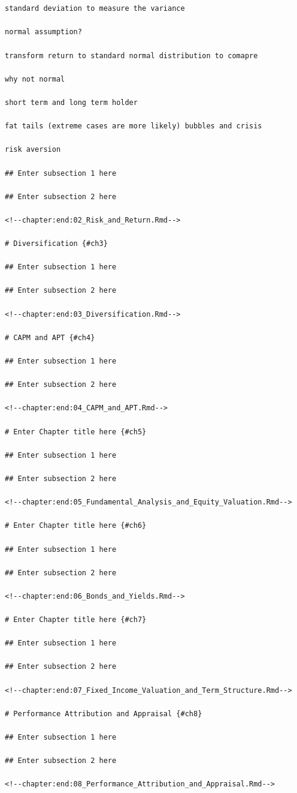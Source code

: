 \documentclass[
]{book}
\begin{document}
\begin{verbatim}


standard deviation to measure the variance

normal assumption? 

transform return to standard normal distribution to comapre

why not normal

short term and long term holder

fat tails (extreme cases are more likely) bubbles and crisis

risk aversion

## Enter subsection 1 here

## Enter subsection 2 here

<!--chapter:end:02_Risk_and_Return.Rmd-->

# Diversification {#ch3}

## Enter subsection 1 here

## Enter subsection 2 here

<!--chapter:end:03_Diversification.Rmd-->

# CAPM and APT {#ch4}

## Enter subsection 1 here

## Enter subsection 2 here

<!--chapter:end:04_CAPM_and_APT.Rmd-->

# Enter Chapter title here {#ch5}

## Enter subsection 1 here

## Enter subsection 2 here

<!--chapter:end:05_Fundamental_Analysis_and_Equity_Valuation.Rmd-->

# Enter Chapter title here {#ch6}

## Enter subsection 1 here

## Enter subsection 2 here

<!--chapter:end:06_Bonds_and_Yields.Rmd-->

# Enter Chapter title here {#ch7}

## Enter subsection 1 here

## Enter subsection 2 here

<!--chapter:end:07_Fixed_Income_Valuation_and_Term_Structure.Rmd-->

# Performance Attribution and Appraisal {#ch8}

## Enter subsection 1 here

## Enter subsection 2 here

<!--chapter:end:08_Performance_Attribution_and_Appraisal.Rmd-->


\end{verbatim}
\end{document}
